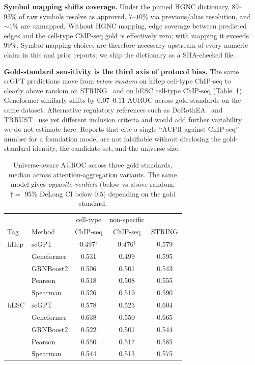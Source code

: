 \documentclass[sigconf, nonacm]{acmart}
\begin{document}
\textbf{Symbol mapping shifts coverage.}
Under the pinned HGNC dictionary, $89$--$93\%$ of raw symbols resolve
as approved, $7$--$10\%$ via previous/alias resolution, and $\sim 1\%$
are unmapped. Without HGNC mapping, edge coverage between
predicted edges and the cell-type ChIP-seq gold is effectively zero;
with mapping it exceeds $99\%$. Symbol-mapping choices are therefore
necessary upstream of every numeric claim in this and prior reports;
we ship the dictionary as a SHA-checked file.

\textbf{Gold-standard sensitivity is the third axis of protocol bias.}
The same scGPT predictions move from \emph{below random} on hHep
cell-type ChIP-seq to clearly above random on STRING~\cite{string2019}
and on hESC cell-type ChIP-seq (Table~\ref{tab:gs_sens}). Geneformer
similarly shifts by $0.07$--$0.11$ AUROC across gold standards on the
same dataset. Alternative regulatory references such as
DoRothEA~\cite{garcia2019dorothea} and TRRUST~\cite{han2018trrust} use
yet different inclusion criteria and would add further variability we
do not estimate here. Reports that cite a single ``AUPR against
ChIP-seq'' number for a foundation model are not falsifiable without
disclosing the gold-standard identity, the candidate set, and the
universe size.

\begin{table}[t]
\caption{Universe-aware AUROC across three gold standards, median
across attention-aggregation variants. The same model gives
\emph{opposite verdicts} (below vs above random, $\dagger = $ 95\%
DeLong CI below $0.5$) depending on the gold standard.}
\label{tab:gs_sens}
\footnotesize
\setlength{\tabcolsep}{4pt}
\begin{tabular}{llccc}
\toprule
& & cell-type & non-specific & \\
Tag & Method & ChIP-seq & ChIP-seq & STRING \\
\midrule
hHep & scGPT       & 0.497$^\dagger$ & 0.476$^\dagger$ & 0.579 \\
     & Geneformer  & 0.531           & 0.499           & 0.595 \\
     & GRNBoost2   & 0.506           & 0.501           & 0.543 \\
     & Pearson     & 0.518           & 0.508           & 0.555 \\
     & Spearman    & 0.526           & 0.519           & 0.590 \\
\midrule
hESC & scGPT       & 0.578           & 0.523           & 0.604 \\
     & Geneformer  & 0.638           & 0.550           & 0.665 \\
     & GRNBoost2   & 0.522           & 0.501           & 0.544 \\
     & Pearson     & 0.550           & 0.517           & 0.585 \\
     & Spearman    & 0.544           & 0.513           & 0.575 \\
\bottomrule
\end{tabular}
\end{table}
\end{document}
